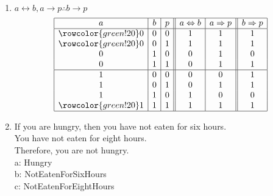 \documentclass{article}
\begin{document}
\begin{enumerate}[label=(\alph*)]
\begin{enumerate}[label=\roman*.]
        \item 
        $a\leftrightarrow{}b,a\rightarrow{}p\therefore{}b\rightarrow{}p$
        \begin{displaymath}
            \begin{array}{|c|c|c||c|c||c|}
            \hline
               a
             & b
             & p
             & a\Leftrightarrow{}b
             & a\Rightarrow{}p
             & b\Rightarrow{}p \\
            \hline
            \rowcolor{green!20}
            0 & 0 & 0 & 1 & 1 & 1 \\
            \rowcolor{green!20}
            0 & 0 & 1 & 1 & 1 & 1 \\
            0 & 1 & 0 & 0 & 1 & 0 \\
            0 & 1 & 1 & 0 & 1 & 1 \\
            \hline
            1 & 0 & 0 & 0 & 0 & 1 \\
            1 & 0 & 1 & 0 & 1 & 1 \\
            1 & 1 & 0 & 1 & 0 & 0 \\
            \rowcolor{green!20}
            1 & 1 & 1 & 1 & 1 & 1 \\
            \hline
            \end{array}
        \end{displaymath}
        
        \item
        If you are hungry, then you have not eaten for six hours. \\
        You have not eaten for eight hours. \\
        Therefore, you are not hungry. \\
        
        a: Hungry \\ 
        b: NotEatenForSixHours \\
        c: NotEatenForEightHours \\
        

\end{enumerate}
\end{enumerate}
\end{document}
